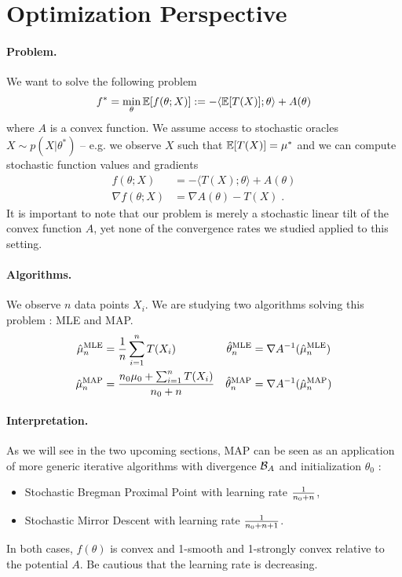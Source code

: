 \documentclass{article}
\newcommand{\logpart}{A}
\newcommand{\bregman}{\cB_\logpart}
\newcommand{\natp}{\theta}
\newcommand{\MAPm}{\hat \mu_n}
\newcommand{\MAPt}{\hat \natp_n}
\begin{document}
\clearpage

\section{Optimization Perspective}
\paragraph{Problem.}
We want  to solve the following problem
\begin{align}
	f^* = \min_\natp \E[f(\natp ; X)] := -\langle \E[T(X)] ; \natp \rangle + \logpart(\natp)
\end{align}
where $\logpart$ is a convex function.
We assume access to stochastic oracles $X \sim p(X | \natp^*)$ -- e.g. we observe $X$ such that $\operatorname{\mathbb{E}}[T(X)] = \mu^*$ and we can compute  stochastic function values and gradients 
\begin{align}
	f(\natp ; X) &= -\langle T(X) ; \natp \rangle + \logpart(\natp) \\
	\nabla f(\natp ; X) &= \nabla \logpart(\natp) - T(X)\; .
\end{align}
It is important to note that our problem is merely a stochastic linear tilt of the convex function $\logpart$, yet none of the convergence rates we studied applied to this setting.

\paragraph{Algorithms.}
We observe $n$ data points $X_i$. 
We are studying two algorithms solving this problem : MLE and MAP.
\begin{align}
	\MAPm^\text{MLE} &= \inv{n}\sum_{i=1}^n T(X_i) 
	&\MAPt^\text{MLE} &= \nabla\logpart^{-1}(\MAPm^\text{MLE}) \\
	\MAPm^\text{MAP} &= \frac{n_0\mu_0 + \smallsum_{i=1}^n T(X_i)}{n_0 + n}
	&\MAPt^\text{MAP} &= \nabla\logpart^{-1}(\MAPm^\text{MAP})	
\end{align}

\paragraph{Interpretation.}
As we will see in the two upcoming sections, MAP can be seen as an application of more generic iterative algorithms with divergence $\bregman$ and initialization $\natp_0$ : 
\begin{itemize}
	\item Stochastic Bregman Proximal Point with learning rate $\frac{1}{n_0+n}$,
	\item Stochastic Mirror Descent with learning rate  $\frac{1}{n_0+n +1}$.
\end{itemize}
In both cases, $f(\natp)$ is convex and 1-smooth  and 1-strongly convex relative to the potential $\logpart$. Be cautious that the learning rate is decreasing.
\end{document}
